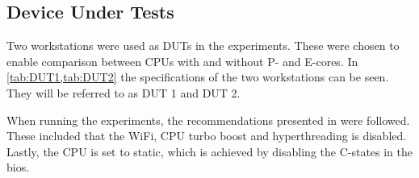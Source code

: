 \subsection{Device Under Tests}
Two workstations were used as DUTs in the experiments. These were chosen to enable comparison between CPUs with and without P- and E-cores. In \cref {tab:DUT1,tab:DUT2} the specifications of the two workstations can be seen. They will be referred to as DUT 1 and DUT 2. 




When running the experiments, the recommendations presented in \cite{Lindholt2022} were followed. These included that the WiFi, CPU turbo boost and hyperthreading is disabled. Lastly, the CPU is set to static, which is achieved by disabling the C-states in the bios.